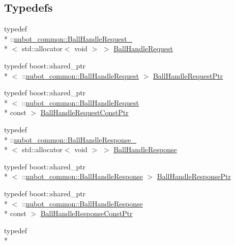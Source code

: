 \subsection*{Typedefs}
\begin{DoxyCompactItemize}
\item 
typedef \\*
\-::\hyperlink{structnubot__common_1_1BallHandleRequest__}{nubot\-\_\-common\-::\-Ball\-Handle\-Request\-\_\-}\\*
$<$ std\-::allocator$<$ void $>$ $>$ \hyperlink{namespacenubot__common_a47b9531f744aace81704d183c8f37107}{Ball\-Handle\-Request}
\item 
typedef boost\-::shared\-\_\-ptr\\*
$<$ \-::\hyperlink{namespacenubot__common_a47b9531f744aace81704d183c8f37107}{nubot\-\_\-common\-::\-Ball\-Handle\-Request} $>$ \hyperlink{namespacenubot__common_ae7e699c9607faea27a823400688f92cb}{Ball\-Handle\-Request\-Ptr}
\item 
typedef boost\-::shared\-\_\-ptr\\*
$<$ \-::\hyperlink{namespacenubot__common_a47b9531f744aace81704d183c8f37107}{nubot\-\_\-common\-::\-Ball\-Handle\-Request} \\*
const  $>$ \hyperlink{namespacenubot__common_a13b0bac07f7e0ff274332e889c7bcc6b}{Ball\-Handle\-Request\-Const\-Ptr}
\item 
typedef \\*
\-::\hyperlink{structnubot__common_1_1BallHandleResponse__}{nubot\-\_\-common\-::\-Ball\-Handle\-Response\-\_\-}\\*
$<$ std\-::allocator$<$ void $>$ $>$ \hyperlink{namespacenubot__common_a794ba6eb699c7139e7256886a99845bb}{Ball\-Handle\-Response}
\item 
typedef boost\-::shared\-\_\-ptr\\*
$<$ \-::\hyperlink{namespacenubot__common_a794ba6eb699c7139e7256886a99845bb}{nubot\-\_\-common\-::\-Ball\-Handle\-Response} $>$ \hyperlink{namespacenubot__common_a5dc998c69f3170b6a93ed0a818a74cc9}{Ball\-Handle\-Response\-Ptr}
\item 
typedef boost\-::shared\-\_\-ptr\\*
$<$ \-::\hyperlink{namespacenubot__common_a794ba6eb699c7139e7256886a99845bb}{nubot\-\_\-common\-::\-Ball\-Handle\-Response} \\*
const  $>$ \hyperlink{namespacenubot__common_aa7fc00ffdb3275b8611d9385a276bae0}{Ball\-Handle\-Response\-Const\-Ptr}
\item 
typedef \\*

\end{DoxyCompactItemize}

